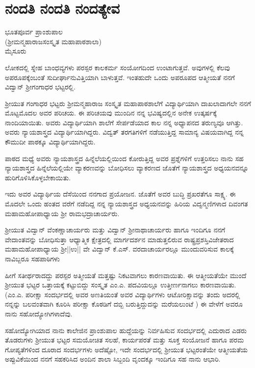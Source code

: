 \chapter{ನಂದತಿ ನಂದತಿ ನಂದತ್ಯೇವ}                           

\begin{center}
\smallskip

ಭೂತಪೂರ್ವ ಪ್ರಾಂಶುಪಾಲ\\
(ಶ್ರೀಮನ್ಮಹಾರಾಜಸಂಸ್ಕೃತ  ಮಹಾಪಾಠಶಾಲಾ)\\
ಮೈಸೂರು
\end{center}
ಲೋಕದಲ್ಲಿ ಸ್ನೇಹ ಬಾಂಧವ್ಯಗಳು ಪರಸ್ಪರ ಕಾಲಕರ್ಮ ಸಂಯೋಗದಿಂದ ಉಂಟಾಗುತ್ತವೆ. ಅವುಗಳಲ್ಲಿ ಕೆಲವು ಅಪರೂಪಕ್ಕೆಂಬಂತೆ ಸುದೀರ್ಘಾನುವಿತ್ತಿಯಾಗಿ ಬಾಳುತ್ತವೆ. ಇಂತಹುದೇ ಒಂದು ಅಪರೂಪದ ಆತ್ಮೀಯತೆ ನನಗೆ ವಿದ್ವಾನ್ ಶ್ರೀಗಂಗಾಧರ ಭಟ್ಟರಲ್ಲಿ. 

ಶ್ರೀಯುತ ಗಂಗಾಧರ ಭಟ್ಟರು ಶ್ರೀಮನ್ಮಹಾರಾಜ ಸಂಸ್ಕೃತ ಮಹಾಪಾಠಶಾಲೆಗೆ ವಿದ್ಯಾರ್ಥಿಯಾಗಿ ದಾಖಲಾದಾಗಲೇ ನನಗೆ ಮೊಟ್ಟಮೊದಲ ಅವರ ಪರಿಚಯ. ಈ ಪರಿಚಯವು ಮುಂದಿನ ನನ್ನ ಭವಿಷ್ಯದಲ್ಲಿನ ಅನೇಕ ಉತ್ಕರ್ಷಕ್ಕೆ ನಾಂದಿಯಾಯಿತು.  ಅವರು ವಿದ್ಯಾರ್ಥಿಯಾಗಿ ಶಾಲೆಗೆ ಸೇರ್ಪಡೆಯಾದ ಕಾಲ ನನ್ನ ಅಧ್ಯಾಪನದ ತರುಣ್ಯವೂ ಆಗಿತ್ತು. ಅವರು ನ್ಯಾಯಶಾಸ್ತ್ರದ ವಿದ್ಯಾರ್ಥಿಯಾಗಿದ್ದರು. ವಿದ್ವತ್ ತರಗತಿಗಳಿಗೆ ನಡೆಯುತ್ತಿದ್ದ ಸಾಮಾನ್ಯ ವಿಷಯವಾಗಿದ್ದ ನನ್ನ ಕೌಮುದೀ ಪಾಠಕ್ಕೂ ವಿದ್ಯಾರ್ಥಿಯಾಗಿದ್ದರು.

ಪಾಠದ ಮಧ್ಯೆ ಅವರು ನ್ಯಾಯಶಾಸ್ತ್ರದ ಹಿನ್ನೆಲೆಯಲ್ಲಿಯಿಂದ ಕೋರುತ್ತಿದ್ದ ಅವರ ಪ್ರಶ್ನೆಗಳಿಗೆ ಉತ್ತರಿಸಲು ನಾನು ಸಹ ನ್ಯಾಯಶಾಸ್ತ್ರದ ಹಿನ್ನೆಲೆಯಲ್ಲಿಯೇ ವ್ಯಾಕರಣವನ್ನು ಬೋಧಿಸಲು ವ್ಯಾಕರಣದ ಜೊತೆಗೆ ನ್ಯಾಯಶಾಸ್ತ್ರದ ಅಧ್ಯಯನವನ್ನೂ ಹುರಿಗೊಳಿಸಿಕೊಳ್ಳಬೇಕಾಯಿತು. 

ಇದು ಅವರ ವಿದ್ಯಾರ್ಥಿಯ ದೆಸೆಯಿಂದ ನನಗಾದ ಪ್ರಯೋಜನ. ಜೊತೆಗೆ ಅವರ ಬುದ್ಧಿ ಪ್ರಖರತೆಗೂ ಸಾಕ್ಷ್ಯ. ಈ ಮೊದಲೇ ಒಂದು ಹಂತದ ವರೆಗೆ ನಡೆದಿದ್ದ ನನ್ನ ನ್ಯಾಯಶಾಸ್ತ್ರದ ಅಧ್ಯಯನವನ್ನು ಹಿರಿಯ ವಿದ್ವನ್ಮಣಿಗಳಾದ ದಿವಂಗತ ಮಹಾಮಹೋಪಾಧ್ಯಾಯ ಶ್ರೀ ರಾಮಭದ್ರಾಚಾರ್ಯರು.

ಶ್ರೀಯುತ ವಿದ್ವಾನ್ ವೆಂಕಣ್ಣಾಚಾರ್ಯರು ಮತ್ತು ವಿದ್ವಾನ್ ಶ್ರೀನಾಥಾಚಾರ್ಯರು ಹಾಗೂ ಇಂದಿಗೂ ನನಗೆ ವೇದಾಂತವನ್ನು ಬೋಧಿಸುತ್ತಾ ಆಧ್ಯಾತ್ಮಿಕ ಕ್ಷೇತ್ರದಲ್ಲಿ ಮಾರ್ಗದರ್ಶನ ಮಾಡುತ್ತಲಿರುವ ರಾಷ್ಟ್ರಪ್ರಶಸ್ತಿವಿಜೇತರಾದ ಮಹಾಮಹೋಪಾಧ್ಯಾಯ ಶ್ರೀ||ಉ|| ವೇ ವಿದ್ವಾನ್ ಕೆ.ಎಸ್. ವರದಾಚಾರ್ಯರಲ್ಲೂ ಮುಂದುವರಿಸುವ ಕಾಲಕ್ಕೆ ನಾವಿಬ್ಬರೂ ಸಹಪಾಠಿಗಳು

ಹೀಗೆ ಸತೀರ್ಥರಾದದ್ದು ಪರಸ್ಪರ ಅತ್ಮೀಯತೆ ಮತ್ತಷ್ಟು ನಿಕಟವಾಗಲು ಕಾರಣವಾಯಿತು. ಈ ಆತ್ಮೀಯತೆಯೇ ಮುಂದೆ ಶ್ರೀಯುತ ಭಟ್ಟರ ಒತ್ತಾಯಕ್ಕೆ ಕಟ್ಟುಬಿದ್ದು ಸಂಸ್ಕೃತ ಎಂ.ಎ. ಪದವಿಯಲ್ಲೂ ಉತ್ತೀರ್ಣನಾಗಲು ಕಾರಣವಾಯಿತು. (ಎಂ.ಎ. ಪರೀಕ್ಷಾ ಸಂದರ್ಭದಲ್ಲಿ ಅವರ ಅಣತಿಯಂತೆ ಅವರ ವಿದ್ಯಾರ್ಥಿಗಳು ಆಟೋರಿಕ್ಷಾವನ್ನು ತಂದು ಅದರಲ್ಲಿ ನನ್ನನ್ನು ಬಲವಂತವಾಗಿ ಕೂರಿಸಿ ಪರೀಕ್ಷಾ ಕೊಠಡಿಗೆ ದಬ್ಬಿ ಬರುತ್ತಿದ್ದುದನ್ನು ಮರೆಯಲುಂಟೆ ) ಈ ವೇಳೆಗೆ ಅವರೂ ನಾನು ಸಹೋದ್ಯೋಗಿಗಳಾದೆವು. 

ಸಹೋದ್ಯೋಗಿಯಾದ ನಾನು ಕಾಲೇಜಿನ ಪ್ರಾಂಶುಪಾಲ ಹುದ್ದೆಯನ್ನು ನಿರ್ವಹಿಸುವ ಸಂದರ್ಭದಲ್ಲಿ ಎದುರಾದ ಎಡರು ತೊಡರುಗಳು ಶ್ರೀಯುತ ಭಟ್ಟರ ಸಮಯೋಚಿತ ಸಲಹೆ, ಕಾರ್ಯಪರತೆ ಮತ್ತು ಸೂಕ್ತ ಸಂಯೋಜನೆ ಹಾಗೂ ಪರಮ ಗೋಪ್ಯತೆಗಳಿಂದ ದೂರಾದ ಸಂದರ್ಭಗಳು ಅದೆಷ್ಟೋ, ಇದೇ ಸಂದರ್ಭದಲ್ಲಿ ಶ್ರೀಯುತ ಭಟ್ಟರಂತೆಯೇ ಆತ್ಮೀಯತೆಯ ಅಪ್ಪುವಿಕೆಯಿಂದ ನನಗೆ ಸಹಕರಿಸಿದ ಅಂದಿನ ಶಾಲಾ ಸಿಬ್ಬಂದಿ ವೃಂದಕ್ಕೂ ಇಂದಿಗೂ ಸಹ ನಾನು ಆಭಾರಿ. 

